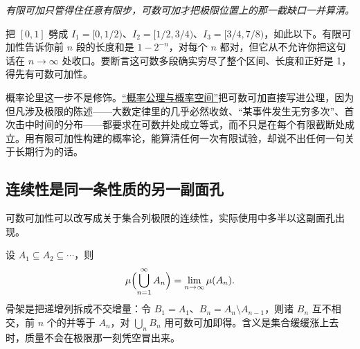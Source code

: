 \begin{center}
\end{center}

\emph{有限可加只管得住任意有限步，可数可加才把极限位置上的那一截缺口一并算清。}

把 \([0,1]\) 劈成 \(I_1=[0,1/2)\)、\(I_2=[1/2,3/4)\)、\(I_3=[3/4,7/8)\)，如此以下。有限可加性告诉你前 \(n\) 段的长度和是 \(1-2^{-n}\)，对每个 \(n\) 都对，但它从不允许你把这句话在 \(n\to\infty\) 处收口。要断言这可数多段确实穷尽了整个区间、长度和正好是 1，得先有可数可加性。

概率论里这一步不是修饰。\hyperref[sec:05-Probability/01-Probability-Spaces/02]{``概率公理与概率空间''}把可数可加直接写进公理，因为但凡涉及极限的陈述——大数定律里的几乎必然收敛、``某事件发生无穷多次''、首次击中时间的分布——都要求在可数并处成立等式，而不只是在每个有限截断处成立。用有限可加性构建的概率论，能算清任何一次有限试验，却说不出任何一句关于长期行为的话。

\subsection{连续性是同一条性质的另一副面孔}

可数可加性可以改写成关于集合列极限的连续性，实际使用中多半以这副面孔出现。

设 \(A_1\subseteq A_2\subseteq\cdots\)，则
\[
\mu\Bigl(\bigcup_{n=1}^{\infty}A_n\Bigr)=\lim_{n\to\infty}\mu(A_n).
\]
骨架是把递增列拆成不交增量：令 \(B_1=A_1\)、\(B_n=A_n\setminus A_{n-1}\)，则诸 \(B_n\) 互不相交，前 \(n\) 个的并等于 \(A_n\)，对 \(\bigcup_n B_n\) 用可数可加即得。含义是集合缓缓涨上去时，质量不会在极限那一刻凭空冒出来。

